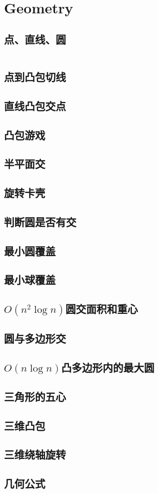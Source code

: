 \chapter{Geometry}
\section{点、直线、圆}
\inputminted{cpp}{Geometry/basic_geometry.cpp}
\section{点到凸包切线}
\section{直线凸包交点}
\section{凸包游戏}
\section{半平面交}
\section{旋转卡壳}
\section{判断圆是否有交}
\section{最小圆覆盖}
\section{最小球覆盖}
\section{$ O(n ^ 2 \log n) $圆交面积和重心}
\section{圆与多边形交}
\section{$ O(n \log n) $凸多边形内的最大圆}
\section{三角形的五心}
\section{三维凸包}
\section{三维绕轴旋转}
\section{几何公式}
